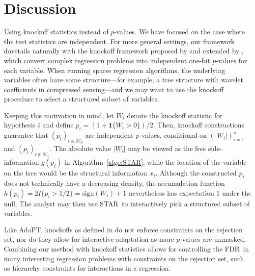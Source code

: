 \documentclass{biometrika}
\newcommand{\cH}{\mathcal{H}}
\newcommand{\textFDR}{FDR}
\renewcommand{\star}{STAR}
\newcommand{\adapt}{AdaPT}
\newcommand{\1}{\mathbf{1}}
\begin{document}

\section{Discussion}
\label{sec:disc}

Using knockoff statistics instead of $p$-values.
We have focused on the case where the test statistics are independent. For more general settings, our framework dovetails naturally with the knockoff framework proposed by \citet{barber15} and extended by \citet{candes2016panning}, which convert complex regression problems into independent one-bit $p$-values for each variable. When running sparse regression algorithms, the underlying variables often have some structure---for example, a tree structure with wavelet coefficients in compressed sensing---and we may want to use the knockoff procedure to select a structured subset of variables. 

Keeping this motivation in mind, let $W_i$ denote the knockoff statistic for hypothesis $i$ and define $p_i = (1+\mathbf{1}\{W_i>0\})/2$. Then, knockoff constructions guarantee that $(p_i)_{i\in \cH_0}$ are independent $p$-values, conditional on $(|W_i|)_{i=1}^n$ and $(p_i)_{i\notin \cH_0}$. The absolute value $|W_i|$ may be viewed as the free side-information $g(p_i)$ in Algorithm~\ref{algo:STAR}, while the location of the variable on the tree would be the structural information $x_i$. Although the constructed $p_i$ does not technically have a decreasing density, the accumulation function $h(p_i) = 2 I\{p_i > 1/2\} = \text{sign}(W_i) + 1$ nevertheless has expectation 1 under the null. The analyst may then use \star ~to interactively pick a structured subset of variables.

Like \adapt, knockoffs as defined in \citet{barber15} do not enforce constraints on the rejection set, nor do they allow for interactive adaptation as more $p$-values are unmasked. Combining our method with knockoff statistics allows for controlling the \textFDR ~in many interesting regression problems with constraints on the rejection set, such as hierarchy constraints for interactions in a regression. 
\end{document}
